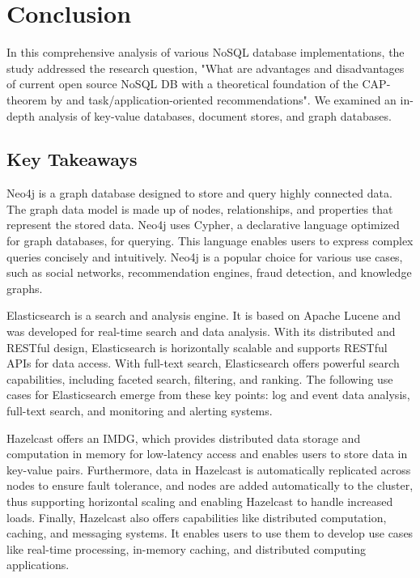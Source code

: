 
\chapter{Conclusion} \label{ch:conclusion}

In this comprehensive analysis of various NoSQL database implementations, the study addressed the research question, "What are advantages and disadvantages of current open source NoSQL DB with a theoretical foundation of the \ac{CAP}-theorem by \textcite{brewer2000towards} and task/application-oriented recommendations". We examined an in-depth analysis of key-value databases, document stores, and graph databases.

\section{Key Takeaways}

Neo4j is a graph database designed to store and query highly connected data. The graph data model is made up of nodes, relationships, and properties that represent the stored data. Neo4j uses Cypher, a declarative language optimized for graph databases, for querying. This language enables users to express complex queries concisely and intuitively. Neo4j is a popular choice for various use cases, such as social networks, recommendation engines, fraud detection, and knowledge graphs.

Elasticsearch is a search and analysis engine. It is based on Apache Lucene and was developed for real-time search and data analysis. With its distributed and RESTful design, Elasticsearch is horizontally scalable and supports RESTful APIs for data access. With full-text search, Elasticsearch offers powerful search capabilities, including faceted search, filtering, and ranking. The following use cases for Elasticsearch emerge from these key points: log and event data analysis, full-text search, and monitoring and alerting systems.

Hazelcast offers an \ac{IMDG}, which provides distributed data storage and computation in memory for low-latency access and enables users to store data in key-value pairs. Furthermore, data in Hazelcast is automatically replicated across nodes to ensure fault tolerance, and nodes are added automatically to the cluster, thus supporting horizontal scaling and enabling Hazelcast to handle increased loads. Finally, Hazelcast also offers capabilities like distributed computation, caching, and messaging systems. It enables users to use them to develop use cases like real-time processing, in-memory caching, and distributed computing applications.

